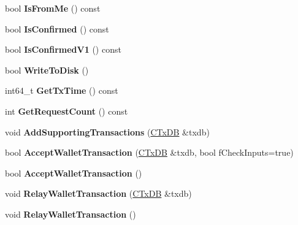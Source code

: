 \begin{DoxyCompactItemize}
\mbox{\label{class_c_wallet_tx_a363b45173dc75c2c4a60655921fc8385}} 
bool {\bfseries Is\+From\+Me} () const
\item 
\mbox{\label{class_c_wallet_tx_a9bb2e834c542979bacee60c7171bdf0b}} 
bool {\bfseries Is\+Confirmed} () const
\item 
\mbox{\label{class_c_wallet_tx_a0dba59ebf7db8002409fd41035edc389}} 
bool {\bfseries Is\+Confirmed\+V1} () const
\item 
\mbox{\label{class_c_wallet_tx_ada0e71d717dd360faf047de54eef4942}} 
bool {\bfseries Write\+To\+Disk} ()
\item 
\mbox{\label{class_c_wallet_tx_ab94368cf0553687d8f1fec5d2aaa1457}} 
int64\+\_\+t {\bfseries Get\+Tx\+Time} () const
\item 
\mbox{\label{class_c_wallet_tx_afd3ca5b54d33038a06189f3f27a97910}} 
int {\bfseries Get\+Request\+Count} () const
\item 
\mbox{\label{class_c_wallet_tx_a3594f3eabada273c1eb9ab25da38d204}} 
void {\bfseries Add\+Supporting\+Transactions} (\mbox{\hyperlink{class_c_tx_d_b}{C\+Tx\+DB}} \&txdb)
\item 
\mbox{\label{class_c_wallet_tx_a0a87fbd0b1f9f3c233a3b81bfd7a03ad}} 
bool {\bfseries Accept\+Wallet\+Transaction} (\mbox{\hyperlink{class_c_tx_d_b}{C\+Tx\+DB}} \&txdb, bool f\+Check\+Inputs=true)
\item 
\mbox{\label{class_c_wallet_tx_aae2016163fb0bd7f0e1464d381ab8293}} 
bool {\bfseries Accept\+Wallet\+Transaction} ()
\item 
\mbox{\label{class_c_wallet_tx_aa139a708a32c3203dcb8587944a4c2ce}} 
void {\bfseries Relay\+Wallet\+Transaction} (\mbox{\hyperlink{class_c_tx_d_b}{C\+Tx\+DB}} \&txdb)
\item 
\mbox{\label{class_c_wallet_tx_a261596523b49778e83a821ecbbb36727}} 
void {\bfseries Relay\+Wallet\+Transaction} ()
\end{DoxyCompactItemize}
